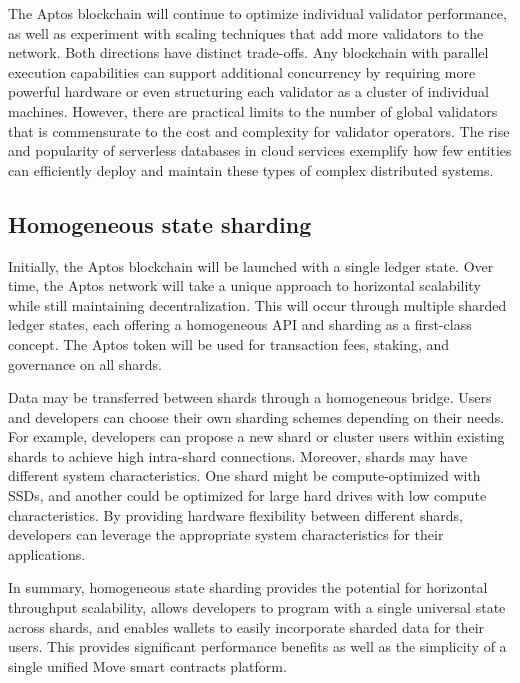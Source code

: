 \documentclass{article}
\begin{document}
The Aptos blockchain will continue to optimize individual validator performance, as well as experiment with scaling techniques that add more validators to the network. Both directions have distinct trade-offs. Any blockchain with parallel execution capabilities can support additional concurrency by requiring more powerful hardware or even structuring each validator as a cluster of individual machines. However, there are practical limits to the number of global validators that is commensurate to the cost and complexity for validator operators. The rise and popularity of serverless databases in cloud services exemplify how few entities can efficiently deploy and maintain these types of complex distributed systems.

\subsection{Homogeneous state sharding}

 Initially, the Aptos blockchain will be launched with a single ledger state. Over time, the Aptos network will take a unique approach to horizontal scalability while still maintaining decentralization. This will occur through multiple sharded ledger states, each offering a homogeneous API and sharding as a first-class concept. The Aptos token will be used for transaction fees, staking, and governance on all shards.
 
 Data may be transferred between shards through a homogeneous bridge. Users and developers can choose their own sharding schemes depending on their needs. For example, developers can propose a new shard or cluster users within existing shards to achieve high intra-shard connections. Moreover, shards may have different system characteristics. One shard might be compute-optimized with SSDs, and another could be optimized for large hard drives with low compute characteristics. By providing hardware flexibility between different shards, developers can leverage the appropriate system characteristics for their applications.
 
 In summary, homogeneous state sharding provides the potential for horizontal throughput scalability, allows developers to program with a single universal state across shards, and enables wallets to easily incorporate sharded data for their users. This provides significant performance benefits as well as the simplicity of a single unified Move smart contracts platform.


\small{

}
\end{document}
